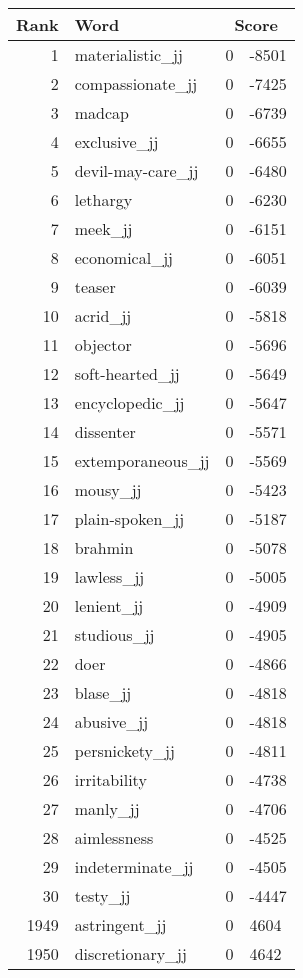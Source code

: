 \begin{longtable}[!htbp]{| rlr@{.}l |}
    \hline
    \textbf{Rank} & \textbf{Word} & \multicolumn{2}{c|}{\textbf{Score}} \\
    \hline
    \endhead
    1 & materialistic\_jj & 0 & -8501 \\
    2 & compassionate\_jj & 0 & -7425 \\
    3 & madcap & 0 & -6739 \\
    4 & exclusive\_jj & 0 & -6655 \\
    5 & devil-may-care\_jj & 0 & -6480 \\
    6 & lethargy & 0 & -6230 \\
    7 & meek\_jj & 0 & -6151 \\
    8 & economical\_jj & 0 & -6051 \\
    9 & teaser & 0 & -6039 \\
    10 & acrid\_jj & 0 & -5818 \\
    11 & objector & 0 & -5696 \\
    12 & soft-hearted\_jj & 0 & -5649 \\
    13 & encyclopedic\_jj & 0 & -5647 \\
    14 & dissenter & 0 & -5571 \\
    15 & extemporaneous\_jj & 0 & -5569 \\
    16 & mousy\_jj & 0 & -5423 \\
    17 & plain-spoken\_jj & 0 & -5187 \\
    18 & brahmin & 0 & -5078 \\
    19 & lawless\_jj & 0 & -5005 \\
    20 & lenient\_jj & 0 & -4909 \\
    21 & studious\_jj & 0 & -4905 \\
    22 & doer & 0 & -4866 \\
    23 & blase\_jj & 0 & -4818 \\
    24 & abusive\_jj & 0 & -4818 \\
    25 & persnickety\_jj & 0 & -4811 \\
    26 & irritability & 0 & -4738 \\
    27 & manly\_jj & 0 & -4706 \\
    28 & aimlessness & 0 & -4525 \\
    29 & indeterminate\_jj & 0 & -4505 \\
    30 & testy\_jj & 0 & -4447 \\
    1949 & astringent\_jj & 0 & 4604 \\
    1950 & discretionary\_jj & 0 & 4642 \\

\end{longtable}
